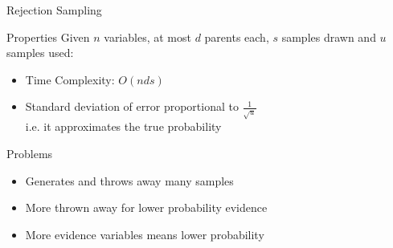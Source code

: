 \documentclass[12pt]{beamer}
\begin{document}
\begin{frame}{Rejection Sampling}
	\begin{block}{Properties}
		Given $n$ variables, at most $d$ parents each, $s$ samples drawn and $u$ samples used:
		\begin{itemize}
			\item Time Complexity: \pause $O(nds)$
			\pause
			\item Standard deviation of error proportional to $\frac{1}{\sqrt{u}}$ \\
			      \pause
			      i.e. it approximates the true probability
		\end{itemize}
	\end{block}
	\pause
	\begin{block}{Problems}
		\begin{itemize}
			\item Generates and throws away many samples
			\item More thrown away for lower probability evidence
			\item More evidence variables means lower probability
		\end{itemize}
	\end{block}
\end{frame}
\end{document}
